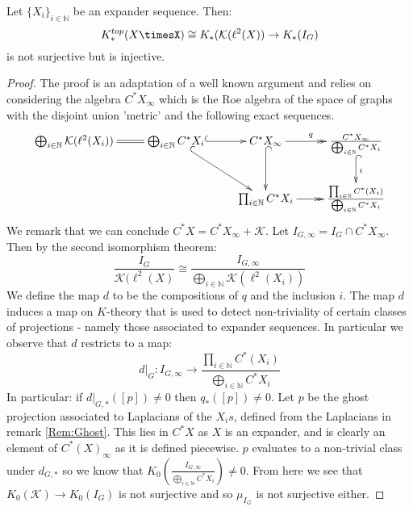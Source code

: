 \begin{conjecture}
{\begin{proposition}\label{Prop:Ghost}
Let $\lbrace X_{i} \rbrace_{i\in \mathbb{N}}$ be an expander sequence. Then:
\begin{equation*}
K_{*}^{top}(X\timesX)\cong K_{*}(\mathcal{K}(\ell^{2}(X)) \rightarrow K_{*}(I_{G})
\end{equation*}
is not surjective but is injective.
\end{proposition}
\begin{proof}
The proof is an adaptation of a well known argument and relies on considering the algebra $C^{*}X_{\infty}$ which is the Roe algebra of the space of graphs with the disjoint union 'metric' and the following exact sequences.
\begin{equation*}
\xymatrix{\bigoplus_{i\in\mathbb{N}}\mathcal{K}(\ell^{2}(X_{i}))\ar@{=}[r] &\bigoplus_{i\in \mathbb{N}}C^{*}X_{i} \ar@{^{(}->}[r]\ar@{^{(}->}[dr] & C^{*}X_{\infty} \ar@{->>}[r]^{q} \ar@{^{(}->}[d] & \frac{C^{*}X_{\infty}}{\bigoplus_{i\in\mathbb{N}}C^{*}X_{i}}\ar@{^{(}->}[d]^{i}\\
& & \prod_{i\in \mathbb{N}}C^{*}X_{i} \ar@{->>}[r]& \frac{\prod_{i\in\mathbb{N}} C^{*}(X_{i})}{\bigoplus_{i\in\mathbb{N}}C^{*}X_{i}}
}
\end{equation*}
We remark that we can conclude $C^{*}X = C^{*}X_{\infty}+\mathcal{K}$. Let $I_{G,\infty} = I_{G}\cap C^{*}X_{\infty}$. Then by the second isomorphism theorem:
\begin{equation*}
\frac{I_{G}}{\mathcal{K}(\ell^{2}(X)}\cong \frac{I_{G,\infty}}{\bigoplus_{i\in\mathbb{N}}\mathcal{K}(\ell^{2}(X_{i}))}
\end{equation*}
We define the map $d$ to be the compositions of $q$ and the inclusion $i$. The map $d$ induces a map on $K$-theory that is used to detect non-triviality of certain classes of projections - namely those associated to expander sequences. In particular we observe that $d$ restricts to a map:
\begin{equation*}
d|_{G}:I_{G,\infty} \rightarrow \frac{\prod_{i\in\mathbb{N}} C^{*}(X_{i})}{\bigoplus_{i\in\mathbb{N}}C^{*}X_{i}}
\end{equation*}
In particular: if $d|_{G,*}([p])\not=0$ then $q_{*}([p])\not=0$. Let $p$ be the ghost projection associated to Laplacians of the $X_{i}s$, defined from the Laplacians in remark \ref{Rem:Ghost}. This lies in $C^{*}X$ as $X$ is an expander, and is clearly an element of $C^{*}(X)_{\infty}$ as it is defined piecewise. $p$ evaluates to a non-trivial class under $d_{G,*}$ so we know that $K_{0}(\frac{I_{G,\infty}}{\bigoplus_{i\in\mathbb{N}}C^{*}X_{i}})\not= 0$. From here we see that $K_{0}(\mathcal{K}) \rightarrow K_{0}(I_{G})$ is not surjective and so $\mu_{I_{G}}$ is not surjective either.


\end{proof}}
\end{conjecture}
